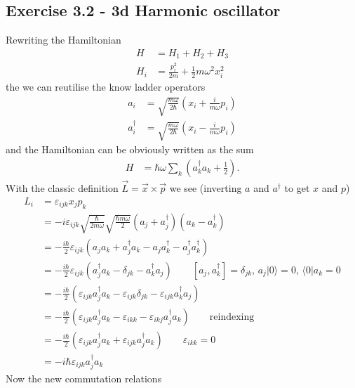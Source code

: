 \documentclass[../main.tex]{subfiles}
\begin{document}
\subsection*{Exercise 3.2 - 3d Harmonic oscillator}
Rewriting the Hamiltonian
\begin{align}
H&=H_1+H_2+H_3\\
H_i&=\frac{p_i^2}{2m}+\frac{1}{2}m\omega^2 x_i^2
\end{align}
the we can reutilise the know ladder operators
\begin{align}
a_i&=\sqrt{\frac{m\omega}{2\hbar}}\left(x_i+\frac{i}{m\omega}p_i\right)\\
a_i^\dagger&=\sqrt{\frac{m\omega}{2\hbar}}\left(x_i-\frac{i}{m\omega}p_i\right)
\end{align}
and the Hamiltonian can be obviously written as the sum
\begin{align}
H&=\hbar\omega\sum_k\left(a_k^\dagger a_k+\frac{1}{2}\right).
\end{align}
With the classic definition $\vec{L}=\vec{x}\times\vec{p}$ we see (inverting $a$ and $a^\dagger$ to get $x$ and $p$)
\begin{align}
L_i&=\varepsilon_{ijk} x_j p_k\\
&=-i\varepsilon_{ijk}\sqrt{\frac{\hbar}{2m\omega}}\sqrt{\frac{\hbar m\omega}{2}}(a_j+a_j^\dagger)(a_k-a_k^\dagger)\\
&=-\frac{i\hbar}{2}\varepsilon_{ijk}(a_ja_k+a_j^\dagger a_k -a_ja_k^\dagger-a_j^\dagger a_k^\dagger)\\
&=-\frac{i\hbar}{2}\varepsilon_{ijk}(a_j^\dagger a_k -\delta_{jk}-a_k^\dagger a_j)\qquad[a_j,a_k^\dagger]=\delta_{jk},\,a_j|0\rangle=0,\,\langle0|a_k=0\\
&=-\frac{i\hbar}{2}(\varepsilon_{ijk}a_j^\dagger a_k -\varepsilon_{ijk}\delta_{jk}-\varepsilon_{ijk}a_k^\dagger a_j)\\
&=-\frac{i\hbar}{2}(\varepsilon_{ijk}a_j^\dagger a_k -\varepsilon_{ikk}-\varepsilon_{ikj}a_j^\dagger a_k)\qquad\text{reindexing}\\
&=-\frac{i\hbar}{2}(\varepsilon_{ijk}a_j^\dagger a_k +\varepsilon_{ijk}a_j^\dagger a_k)\qquad\varepsilon_{ikk}=0\\
&=-i\hbar\varepsilon_{ijk}a_j^\dagger a_k
\end{align}
Now the new commutation relations
\end{document}
